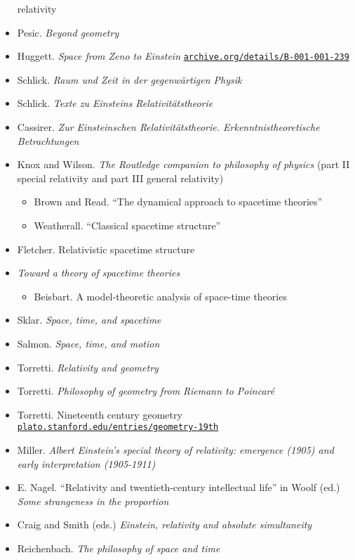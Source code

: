 \documentclass[11pt]{article}
\newcommand\rurl[1]{%
  \href{http://#1}{\nolinkurl{#1}}%
}
\begin{document}
\begin{itemize}
  relativity
\item Pesic. \textit{Beyond geometry}
\item Huggett. \emph{Space from Zeno to Einstein}
  \rurl{archive.org/details/B-001-001-239}
\item Schlick. \emph{Raum und Zeit in der gegenw{\"a}rtigen Physik}
\item Schlick. \textit{Texte zu Einsteins Relativit{\"a}tstheorie}
\item Cassirer. \textit{Zur Einsteinschen
    Relativitätstheorie. Erkenntnistheoretische Betrachtungen}
\item Knox and Wilson. \textit{The Routledge companion to philosophy
    of physics} (part II special relativity and part III general
  relativity)
\begin{itemize}
\item Brown and Read. ``The dynamical approach to spacetime theories''
\item Weatherall. ``Classical spacetime structure''
\end{itemize}
\item Fletcher. Relativistic spacetime structure
\item \textit{Toward a theory of spacetime theories}
  \begin{itemize}
  \item Beisbart. A model-theoretic analysis of space-time theories
  \end{itemize}
\item Sklar. \textit{Space, time, and spacetime}
\item Salmon. \textit{Space, time, and motion}
\item Torretti. \textit{Relativity and geometry}
\item Torretti. \textit{Philosophy of geometry from Riemann to
    Poincar{\'e}}
\item Torretti. Nineteenth century geometry
  \rurl{plato.stanford.edu/entries/geometry-19th}
\item Miller. \textit{Albert Einstein's special theory of relativity:
    emergence (1905) and early interpretation (1905-1911)}
\item E. Nagel. ``Relativity and twentieth-century intellectual life''
  in Woolf (ed.) \textit{Some strangeness in the proportion}
\item Craig and Smith (eds.) \textit{Einstein, relativity and absolute
    simultaneity}
\item Reichenbach. \textit{The philosophy of space and time}

\end{itemize}
\end{document}

